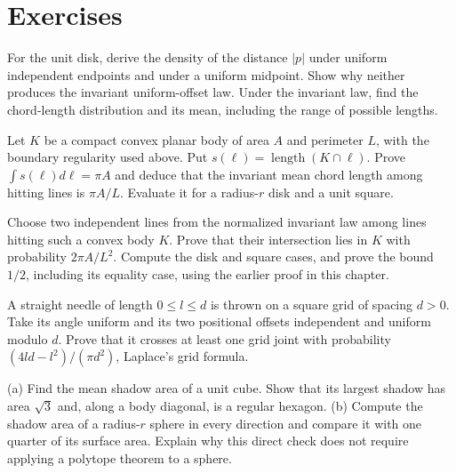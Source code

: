 \section{Exercises}

\begin{exercise}[$\star$]\label{ex:bertrandlaws}
For the unit disk, derive the density of the distance $|p|$ under uniform independent endpoints and under a uniform midpoint. Show why neither produces the invariant uniform-offset law. Under the invariant law, find the chord-length distribution and its mean, including the range of possible lengths.
\end{exercise}

\begin{exercise}[$\star$]\label{ex:chord}
Let $K$ be a compact convex planar body of area $A$ and perimeter $L$, with the boundary regularity used above. Put $s(\ell)=\operatorname{length}(K\cap\ell)$. Prove $\int s(\ell)d\ell=\pi A$ and deduce that the invariant mean chord length among hitting lines is $\pi A/L$. Evaluate it for a radius-$r$ disk and a unit square.
\end{exercise}

\begin{exercise}[$\star\star$]\label{ex:twolines}
Choose two independent lines from the normalized invariant law among lines hitting such a convex body $K$. Prove that their intersection lies in $K$ with probability $2\pi A/L^2$. Compute the disk and square cases, and prove the bound $1/2$, including its equality case, using the earlier proof in this chapter.
\end{exercise}

\begin{exercise}[$\star\star$]\label{ex:laplacegrid}
A straight needle of length $0\le l\le d$ is thrown on a square grid of spacing $d>0$. Take its angle uniform and its two positional offsets independent and uniform modulo $d$. Prove that it crosses at least one grid joint with probability $(4ld-l^2)/(\pi d^2)$, Laplace's grid formula.
\end{exercise}

\begin{exercise}[$\star$]\label{ex:shadows}
(a) Find the mean shadow area of a unit cube. Show that its largest shadow has area $\sqrt3$ and, along a body diagonal, is a regular hexagon.
(b) Compute the shadow area of a radius-$r$ sphere in every direction and compare it with one quarter of its surface area. Explain why this direct check does not require applying a polytope theorem to a sphere.
\end{exercise}

